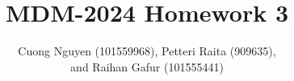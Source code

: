 \documentclass[a4paper,12pt]{article}
\title{MDM-2024 Homework 3}
\author{Cuong Nguyen (101559968), Petteri Raita (909635),\\and Raihan Gafur (101555441)}
\begin{document}
\maketitle
\tableofcontents
\newpage

\listoffigures
\newpage


% 


% 
% 
% 


\begin{appendices}
    
\end{appendices}
\end{document}
